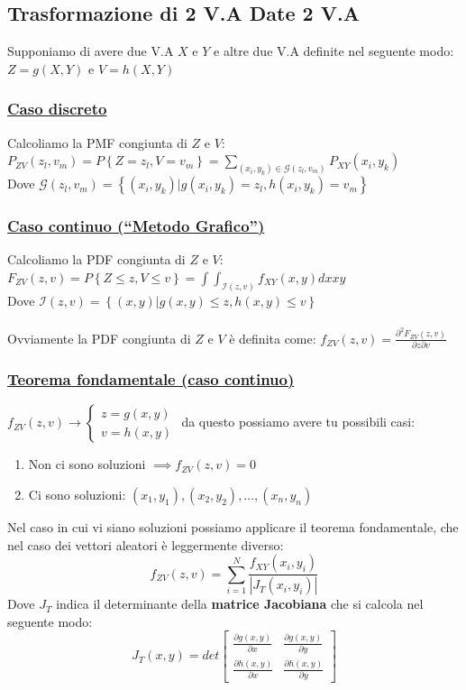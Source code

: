 \documentclass{article}
\begin{document}
\subsection{Trasformazione di 2 V.A Date 2 V.A}
Supponiamo di avere due V.A $X$ e $Y$ e altre due V.A definite nel seguente modo: $Z = g(X,Y)$ e $V = h(X,Y)$
\subsubsection{\underline{Caso discreto}}
Calcoliamo la PMF congiunta di $Z$ e $V$: \\
$P_{ZV}(z_l,v_m) = P \left\{ Z = z_l, V = v_m \right\} = \sum_{(x_i,y_k) \in \mathcal{G}(z_l,v_m)} P_{XY}(x_i,y_k)$ \\
Dove $\mathcal{G}(z_l,v_m) = \left\{ (x_i,y_k) | g(x_i,y_k) = z_l, h(x_i,y_k) = v_m \right\}$
\subsubsection{\underline{Caso continuo (“Metodo Grafico”)}}
Calcoliamo la PDF congiunta di $Z$ e $V$: \\
$F_{ZV}(z,v) = P \left\{ Z \leq z, V \leq v \right\} = \int \int_{\mathcal{I}(z,v)} f_{XY}(x,y) dx xy$ \\
Dove $\mathcal{I}(z,v) = \left\{ (x,y) | g(x,y) \leq z, h(x,y) \leq v\right\}$ \\ \\
Ovviamente la PDF congiunta di $Z$ e $V$ è definita come: $f_{ZV}(z,v) = \frac{\partial^2 F_{ZV}(z,v)}{\partial z \partial v}$
\subsubsection{\underline{Teorema fondamentale (caso continuo)}}
$f_{ZV}(z,v) \rightarrow \begin{cases}
    z = g(x,y) \\
    v = h(x,y)
\end{cases}$ da questo possiamo avere tu possibili casi:
\begin{enumerate}
    \item Non ci sono soluzioni $\implies f_{ZV}(z,v) = 0$
    \item Ci sono soluzioni: $(x_1,y_1), (x_2,y_2), \dots, (x_n,y_n)$
\end{enumerate}
Nel caso in cui vi siano soluzioni possiamo applicare il teorema fondamentale, che nel caso dei vettori aleatori è leggermente diverso: \\
\[f_{ZV}(z,v) = \sum_{i = 1}^{N} \frac{f_{XY}(x_i,y_i)}{\left| J_T(x_i,y_i)\right|}\]
Dove $J_T$ indica il determinante della \textbf{matrice Jacobiana} che si calcola nel seguente modo: 
\[J_T(x,y) = det \begin{bmatrix}
    \frac{\partial g(x,y)}{\partial x} & \frac{\partial g(x,y)}{\partial y} \\
    \frac{\partial h(x,y)}{\partial x} & \frac{\partial h(x,y)}{\partial y} 
\end{bmatrix}\]
\end{document}
